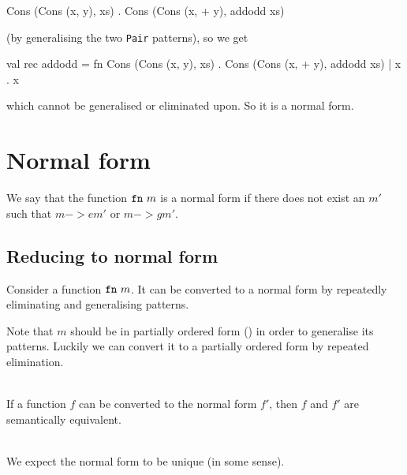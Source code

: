 \begin{example}[Generalisation, $->g$]
\begin{sml}
Cons (Cons (x, y), xs) . Cons (Cons (x, + y), addodd xs)
\end{sml}
\noindent (by generalising the two \texttt{Pair} patterns), so we get

\begin{sml}
val rec addodd = 
fn Cons (Cons (x, y), xs) .
     Cons (Cons (x, + y), addodd xs)
 | x . x
\end{sml}
which cannot be generalised or eliminated upon. So it is a normal form.

\end{example}

\section{Normal form}
We say that the function $\texttt{fn}\  m$ is a normal form if there does not exist an
$m'$ such that $m ->e m'$ or $m ->g m'$.

\subsection{Reducing to normal form}
Consider a function $\texttt{fn}\  m$. It can be converted to a normal form by repeatedly
eliminating and generalising patterns.

Note that $m$ should be in partially ordered form () in
order to generalise its patterns. Luckily we can convert it to a partially
ordered form by repeated elimination.

\begin{lemma}\ \\
  If a function $f$ can be converted to the normal form $f'$, then $f$ and $f'$
  are semantically equivalent.
\end{lemma}

\begin{lemma}\ \\
  We expect the normal form to be unique (in some sense).
\end{lemma}

